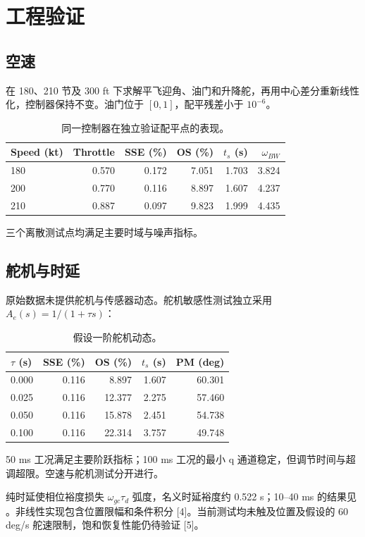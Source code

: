 \documentclass[UTF8,a4paper,11pt,fontset=windows]{ctexart}
\newcommand{\file}[1]{\texttt{\detokenize{#1}}}
\begin{document}
\clearpage\section{工程验证}
\subsection{空速}
在 180、210 节及 300 ft 下求解平飞迎角、油门和升降舵，再用中心差分重新线性化，控制器保持不变。油门位于 $[0,1]$，配平残差小于 $10^{-6}$。
\begin{table}[H]\centering\small\caption{同一控制器在独立验证配平点的表现。}
\begin{tabular}{lrrrrr}\toprule
Speed (kt) & Throttle & SSE (\%) & OS (\%) & $t_s$ (s) & $\omega_{BW}$\\\midrule
180 & 0.570 & 0.172 & 7.051 & 1.703 & 3.824\\
200 & 0.770 & 0.116 & 8.897 & 1.607 & 4.237\\
210 & 0.887 & 0.097 & 9.823 & 1.999 & 4.435\\
\bottomrule\end{tabular}\end{table}

三个离散测试点均满足主要时域与噪声指标。

\subsection{舵机与时延}
原始数据未提供舵机与传感器动态。舵机敏感性测试独立采用 $A_e(s)=1/(1+\tau s)$：
\begin{table}[H]\centering\small\caption{假设一阶舵机动态。}
\begin{tabular}{lrrrr}\toprule
$\tau$ (s) & SSE (\%) & OS (\%) & $t_s$ (s) & PM (deg)\\\midrule
0.000 & 0.116 & 8.897 & 1.607 & 60.301\\
0.025 & 0.116 & 12.377 & 2.275 & 57.460\\
0.050 & 0.116 & 15.878 & 2.451 & 54.738\\
0.100 & 0.116 & 22.314 & 3.757 & 49.748\\
\bottomrule\end{tabular}\end{table}

50 ms 工况满足主要阶跃指标；100 ms 工况的最小 q 通道稳定，但调节时间与超调超限。空速与舵机测试分开进行。

纯时延使相位裕度损失 $\omega_{gc}\tau_d$ 弧度，名义时延裕度约 0.522 s；10--40 ms 的结果见 \file{delay.csv}。非线性实现包含位置限幅和条件积分 [4]。当前测试均未触及位置及假设的 60 deg/s 舵速限制，饱和恢复性能仍待验证 [5]。
\end{document}

